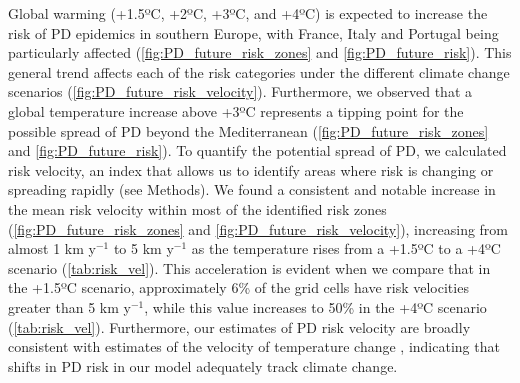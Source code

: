 Global warming (+1.5ºC, +2ºC, +3ºC, and +4ºC) is expected to increase the
risk of PD epidemics in southern Europe, with France, Italy and Portugal being
particularly affected (\cref{fig:PD_future_risk_zones} and
\cref{fig:PD_future_risk}). This general trend affects each of the risk
categories under the different climate change scenarios
(\cref{fig:PD_future_risk_velocity}). Furthermore, we observed that a global
temperature increase above +3ºC represents a tipping point for the possible
spread of PD beyond the Mediterranean (\cref{fig:PD_future_risk_zones} and
\cref{fig:PD_future_risk}). To quantify the potential spread of PD, we
calculated risk velocity, an index that allows us to identify areas where risk
is changing  or spreading rapidly (see Methods). We found a consistent and
notable increase in the mean risk velocity within most of the identified risk
zones (\cref{fig:PD_future_risk_zones} and \cref{fig:PD_future_risk_velocity}),
increasing from almost 1 km y$^{-1}$ to 5
km y$^{-1}$ as the temperature rises from a +1.5ºC to a +4ºC scenario
(\cref{tab:risk_vel}). This acceleration is evident when we
compare that in
the +1.5ºC scenario, approximately 6\% of the grid cells have risk velocities
greater than 5 km y$^{\mathrm{-1}}$, while this value increases to 50\% in the
+4ºC scenario (\cref{tab:risk_vel}). Furthermore, our estimates of
PD risk
velocity are broadly consistent with estimates of the velocity of temperature
change \cite{Loarie2009}, indicating that shifts in PD risk in our model
adequately track climate change.

